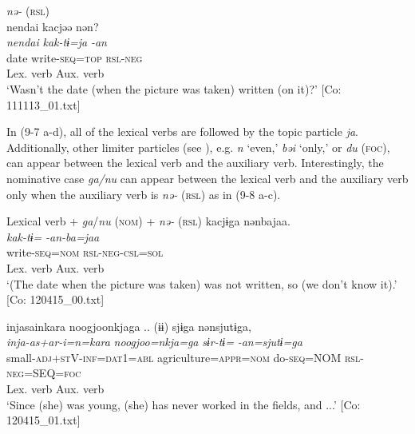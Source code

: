 \ex \textit{nə-} (\textsc{rsl}) \label{ex:9.7d}\\
    \gllll    {\textbar}nendai{\textbar}  kacjəə  nən?\\
      \textit{nendai}  \textit{kak-tɨ=ja}  \textit{-an}\\
      date  write-\textsc{seq}=\textsc{top}  \textsc{rsl}-\textsc{neg}\\
        Lex. verb  Aux. verb\\
      \glt       ‘Wasn’t the date (when the picture was taken) written (on it)?’ [Co: 111113\_01.txt]
    \z
\z

In (9-7 a-d), all of the lexical verbs are followed by the topic particle \textit{ja}. Additionally, other limiter particles (see ), e.g. \textit{n} ‘even,’ \textit{bəi} ‘only,’ or \textit{du} (\textsc{foc}), can appear between the lexical verb and the auxiliary verb. Interestingly, the nominative case \textit{ga/nu} can appear between the lexical verb and the auxiliary verb only when the auxiliary verb is \textit{nə-} (\textsc{rsl}) as in (9-8 a-c).

\ea   Lexical verb + \textit{ga}/\textit{nu} (\textsc{nom}) + \textit{nə-} (\textsc{rsl}) \label{ex:9.8}
\ea %
 \gllll  kacjɨga  nənbajaa.\\
      \textit{kak-tɨ=}  \textit{-an-ba=jaa}\\
      write-\textsc{seq}=\textsc{nom}  \textsc{rsl}-\textsc{neg}-\textsc{csl}=\textsc{sol}\\
      Lex. verb  Aux. verb\\
      \glt       ‘(The date when the picture was taken) was not written, so (we don’t know it).’ [Co: 120415\_00.txt]

\ex \label{ex:9.8b} %
    \gllll  injasainkara  noogjoonkjaga ..  (ɨɨ)                   sjɨga  nənsjutɨga,\\
      \textit{inja-as+ar-i=n=kara}  \textit{noogjoo=nkja=ga}            \textit{sɨr-tɨ=}  \textit{-an=sjutɨ=ga}\\
      small-\textsc{adj}+\textsc{st}V-\textsc{inf}=\textsc{dat}1=\textsc{abl}  agriculture=\textsc{appr}=\textsc{nom}                  do-\textsc{seq}=NOM  \textsc{rsl}-\textsc{neg}=SEQ=\textsc{foc}\\
                                                                        Lex. verb  Aux. verb\\
      \glt       ‘Since (she) was young, (she) has never worked in the fields, and ...’ [Co: 120415\_01.txt]

